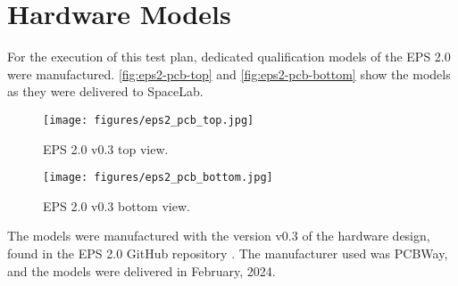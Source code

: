 %
%
%
%
%

%
%
%
%
%

\chapter{Hardware Models} \label{ch:product-presentation}

For the execution of this test plan, dedicated qualification models of the EPS 2.0 were manufactured.
\autoref{fig:eps2-pcb-top} and \autoref{fig:eps2-pcb-bottom} show the models as they were delivered to SpaceLab.

\begin{figure}[htp]
    \centering
    \texttt{[image: figures/eps2\_pcb\_top.jpg]}
    \caption{EPS 2.0 v0.3 top view.}
    \label{fig:eps2-pcb-top}
\end{figure}


\begin{figure}[htp]
    \centering
    \texttt{[image: figures/eps2\_pcb\_bottom.jpg]}
    \caption{EPS 2.0 v0.3 bottom view.}
    \label{fig:eps2-pcb-bottom}
\end{figure}

The models were manufactured with the version v0.3 of the hardware design, found in the EPS 2.0 GitHub repository \cite{eps2-github}.
The manufacturer used was PCBWay, and the models were delivered in February, 2024.
